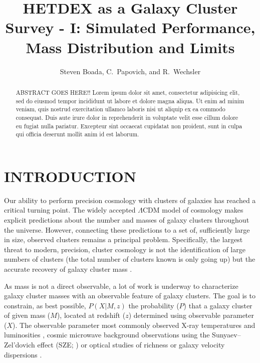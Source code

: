 \documentclass[apj, revtex4]{emulateapj}
\begin{document}
\title{HETDEX as a Galaxy Cluster Survey - I: Simulated Performance, Mass Distribution and Limits}

\author{\sc Steven Boada, 
C.~Papovich, and
R.~Wechsler} 


\begin{abstract}
\noindent
ABSTRACT GOES HERE!!
Lorem ipsum dolor sit amet, consectetur adipisicing elit, sed do eiusmod tempor incididunt ut labore et dolore magna aliqua. Ut enim ad minim veniam, quis nostrud exercitation ullamco laboris nisi ut aliquip ex ea commodo consequat. Duis aute irure dolor in reprehenderit in voluptate velit esse cillum dolore eu fugiat nulla pariatur. Excepteur sint occaecat cupidatat non proident, sunt in culpa qui officia deserunt mollit anim id est laborum.
\end{abstract}

\section{INTRODUCTION}
Our ability to perform precision cosmology with clusters of galaxies has reached a critical turning point. The widely accepted $\Lambda$CDM model of cosmology makes explicit predictions about the number and masses of galaxy clusters throughout the universe. However, connecting these predictions to a set of, sufficiently large in size, observed clusters remains a principal problem. Specifically, the largest threat to modern, precision, cluster cosmology is not the identification of large numbers of clusters (the total number of clusters known is only going up) but the accurate recovery of galaxy cluster mass .

As mass is not a direct observable, a lot of work is underway to characterize galaxy cluster masses with an observable feature of galaxy clusters. The goal is to constrain, as best possible, $P(X|M,z)$ the probability ($P$) that a galaxy cluster of given mass ($M$), located at redshift ($z$) determined using observable parameter ($X$). The observable parameter most commonly observed X-ray temperatures and luminosities , cosmic microwave background observations  using the Sunyaev--Zel’dovich effect (SZE; \citealt{Sunyaev1972}) or optical studies  of richness  or galaxy velocity dispersions .
\end{document}
